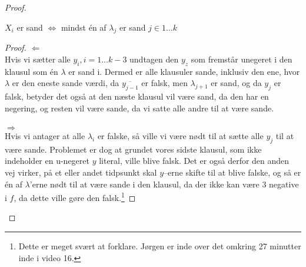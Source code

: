 \begin{proof}
	\begin{claim}
		$X_{i}$ er sand $\iff$ mindst én af $\lambda_{j}$ er sand $j \in 1 \ldots k$
	\end{claim}

	\begin{proof}
		\(\Leftarrow\)\\
		\noindent
		Hvis vi sætter alle $y_{i}, i = 1 \ldots k-3$  undtagen den $y_{z}$  som fremstår unegeret i den klausul som én \(\lambda\) er sand i. Dermed er alle klausuler sande, inklusiv den ene, hvor \(\lambda\) er den eneste sande værdi, da $\overline{y_{j-1}}$ er falsk, men \(\lambda_{j+1}\) er sand, og da $y_{j}$ er falsk, betyder det også at den næste klausul vil være sand, da den har en negering, og resten vil være sande, da vi satte alle andre til at være sande.\\\\
		\noindent
		\(\Rightarrow\)\\
		\noindent
		Hvis vi antager at alle $\lambda_{i}$ er falske, så ville vi være nødt til at sætte alle $y_{j}$ til at være sande. Problemet er dog at grundet vores sidste klausul, som ikke indeholder en u-negeret $y$ literal, ville blive falsk. Det er også derfor den anden vej virker, på et eller andet tidpsunkt skal $y$--erne skifte til at blive falske, og så er én af $\lambda$'erne nødt til at være sande i den klausul, da der ikke kan være 3 negative i $f$, da dette ville gøre den falsk.\footnote{Dette er meget svært at forklare. Jørgen er inde over det omkring 27 minutter inde i video 16.}
	\end{proof}
\end{proof}



